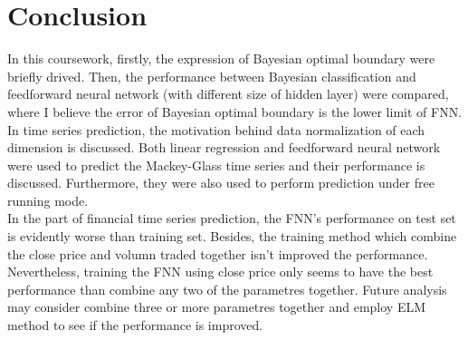 \documentclass[journal,twocolumn,letterpaper,12pt]{article}
\begin{document}
\section{Conclusion}
In this coursework, firstly, the expression of Bayesian optimal boundary were briefly drived. Then, the performance between Bayesian classification and feedforward neural network (with different size of hidden layer) were compared, where I believe the error of Bayesian optimal boundary is the lower limit of FNN.\\
In time series prediction, the motivation behind data normalization of each dimension is discussed. Both linear regression and feedforward neural network were used to predict the Mackey-Glass time series and their performance is discussed. Furthermore, they were also used to perform prediction under free running mode.\\
In the part of financial time series prediction, the FNN's performance on test set is evidently worse than training set. Besides, the training method which combine the close price and volumn traded together isn't improved the performance.\\
Nevertheless, training the FNN using close price only seems to have the best performance than combine any two of the parametres together. Future analysis may consider combine three or more parametres together and employ ELM method to see if the performance is improved.



\end{document}
